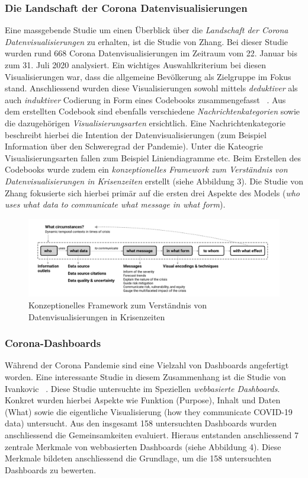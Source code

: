  \subsubsection{Die Landschaft der Corona Datenvisualisierungen}
 Eine massgebende Studie um einen Überblick über die \textit{Landschaft der Corona Datenvisualisierungen} zu erhalten, ist die Studie von Zhang. Bei dieser Studie wurden rund 668 Corona Datenvisualisierungen im Zeitraum vom 22. Januar bis zum 31. Juli 2020 analysiert. Ein wichtiges Auswahlkriterium bei diesen Visualisierungen war, dass die allgemeine Bevölkerung als Zielgruppe im Fokus stand. Anschliessend wurden diese Visualisierungen sowohl mittels \textit{deduktiver} als auch \textit{induktiver} Codierung in Form eines Codebooks zusammengefasst ~\citep[S. 3]{yixuan_zhang}. Aus dem erstellten Codebook sind ebenfalls verschiedene \textit{Nachrichtenkategorien} sowie die dazugehörigen \textit{Visualisierungsarten} ersichtlich. Eine Nachrichtenkategorie beschreibt hierbei die Intention der Datenvisualisierungen (zum Beispiel Information über den Schweregrad der Pandemie). Unter die Kateogrie Visualisierungsarten fallen zum Beispiel Liniendiagramme etc. Beim Erstellen des Codebooks wurde zudem ein \textit{konzeptionelles Framework zum Verständnis von Datenvisualisierungen in Krisenzeiten} erstellt (siehe Abbildung 3). Die Studie von Zhang fokusierte sich hierbei primär auf die ersten drei Aspekte des Models (\textit{who uses what data to communicate what message in what form}). 
 
 \begin{figure}[ht]
    \includegraphics[width=12cm]{images/zhang_conceptual_framework.png}
    \centering
    \caption{Konzeptionelles Framework zum Verständnis von Datenvisualisierungen in Krisenzeiten ~\citep[S. 4]{yixuan_zhang}}
\end{figure}
 
\subsubsection{Corona-Dashboards}
Während der Corona Pandemie sind eine Vielzahl von Dashboards angefertigt worden. Eine interessante Studie in diesem Zusammenhang ist die Studie von Ivankovic ~\citep{ivankovic}. Diese Studie untersuchte im Speziellen \textit{webbasierte Dashboards}. Konkret wurden hierbei Aspekte wie Funktion (Purpose), Inhalt und Daten (What) sowie die eigentliche Visualisierung (how they communicate COVID-19 data) untersucht. Aus den insgesamt 158 untersuchten Dashboards wurden anschliessend die Gemeinsamkeiten evaluiert. Hieraus entstanden anschliessend 7 zentrale Merkmale von webbasierten Dashboards (siehe Abbildung 4). Diese Merkmale bildeten anschliessend die Grundlage, um die 158 untersuchten Dashboards zu bewerten.
\clearpage

